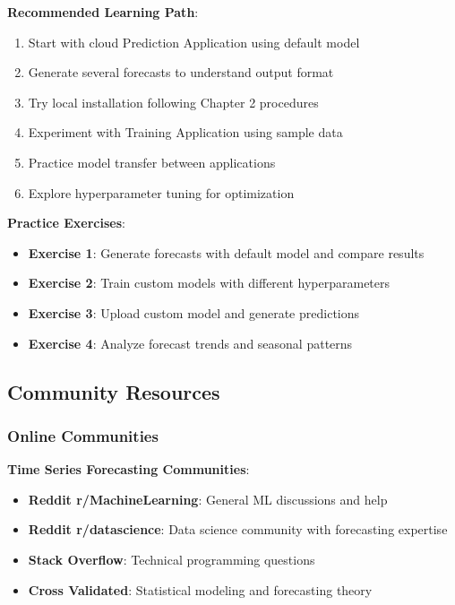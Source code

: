 \textbf{Recommended Learning Path}:
\begin{enumerate}
    \item Start with cloud Prediction Application using default model
    \item Generate several forecasts to understand output format
    \item Try local installation following Chapter 2 procedures
    \item Experiment with Training Application using sample data
    \item Practice model transfer between applications
    \item Explore hyperparameter tuning for optimization
\end{enumerate}

\textbf{Practice Exercises}:
\begin{itemize}
    \item \textbf{Exercise 1}: Generate forecasts with default model and compare results
    \item \textbf{Exercise 2}: Train custom models with different hyperparameters
    \item \textbf{Exercise 3}: Upload custom model and generate predictions
    \item \textbf{Exercise 4}: Analyze forecast trends and seasonal patterns
\end{itemize}

\subsection{Community Resources}

\subsubsection{Online Communities}

\textbf{Time Series Forecasting Communities}:
\begin{itemize}
    \item \textbf{Reddit r/MachineLearning}: General ML discussions and help
    \item \textbf{Reddit r/datascience}: Data science community with forecasting expertise
    \item \textbf{Stack Overflow}: Technical programming questions
    \item \textbf{Cross Validated}: Statistical modeling and forecasting theory
\end{itemize}

